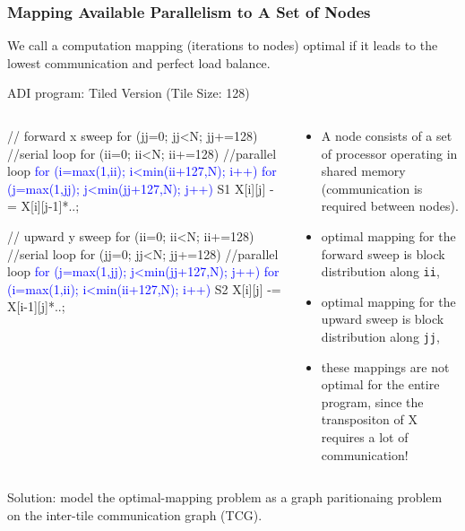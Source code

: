 \documentclass{beamer}
\newcommand{\blue}[1]{\textcolor{Blue}{{#1}}}
\newcommand{\emp}[1]{\textcolor{DikuRed}{ #1}}
\newcommand{\emphh}[1]{\textcolor{CosGreen}{ #1}}
\begin{document}
\begin{frame}[fragile,t]
  \frametitle{Mapping Available Parallelism to A Set of Nodes}


We call a computation mapping (iterations to nodes) \emphh{optimal}
if it leads to the lowest communication and perfect load balance.

\begin{block}{ADI program: Tiled Version (Tile Size: 128)}
\begin{columns}
\begin{colorcode}
// forward x sweep
\emp{for (jj=0; jj<N; jj+=128)} //serial loop
 \emphh{for (ii=0; ii<N; ii+=128)} //parallel loop
  \blue{for (i=max(1,ii); i<min(ii+127,N); i++)}
   \blue{for (j=max(1,jj); j<min(jj+127,N); j++)}
S1   X[i][j] -= X[i][j-1]*..;

// upward y sweep
\emp{for (ii=0; ii<N; ii+=128)} //serial loop
 \emphh{for (jj=0; jj<N; jj+=128)} //parallel loop
  \blue{for (j=max(1,jj); j<min(jj+127,N); j++)}
   \blue{for (i=max(1,ii); i<min(ii+127,N); i++)}
S2   X[i][j] -= X[i-1][j]*..;
\end{colorcode}
\begin{scriptsize}
\begin{itemize}
    \item A node consists of a set of processor operating in 
            shared memory (communication is required between nodes). 

    \item \emphh{optimal mapping} for the forward sweep is 
            block distribution along {\tt ii},
    \item \emphh{optimal mapping} for the upward sweep is
            block distribution along {\tt jj},
    \item these mappings are \alert{not optimal for the entire
            program}, since the transpositon of X requires
            a lot of communication!
\end  {itemize}
\end{scriptsize}
\end{columns}
\end{block} 

\emphh{Solution: model the optimal-mapping problem 
as a graph paritionaing problem on the inter-tile communication
graph (TCG).} 

\end{frame}
\end{document}
